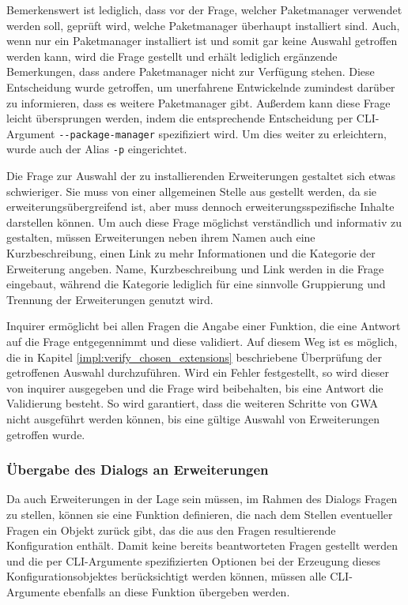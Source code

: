 Bemerkenswert ist lediglich, dass vor der Frage, welcher Paketmanager verwendet werden soll, geprüft wird, welche Paketmanager überhaupt installiert sind. Auch, wenn nur ein Paketmanager installiert ist und somit gar keine Auswahl getroffen werden kann, wird die Frage gestellt und erhält lediglich ergänzende Bemerkungen, dass andere Paketmanager nicht zur Verfügung stehen. Diese Entscheidung wurde getroffen, um unerfahrene Entwickelnde zumindest darüber zu informieren, dass es weitere Paketmanager gibt. Außerdem kann diese Frage leicht übersprungen werden, indem die entsprechende Entscheidung per \gls{CLI}-Argument \verb|--package-manager| spezifiziert wird. Um dies weiter zu erleichtern, wurde auch der Alias \verb|-p| eingerichtet.

Die Frage zur Auswahl der zu installierenden Erweiterungen gestaltet sich etwas schwieriger. Sie muss von einer allgemeinen Stelle aus gestellt werden, da sie erweiterungsübergreifend ist, aber muss dennoch erweiterungsspezifische Inhalte darstellen können. Um auch diese Frage möglichst verständlich und informativ zu gestalten, müssen Erweiterungen neben ihrem Namen auch eine Kurzbeschreibung, einen Link zu mehr Informationen und die Kategorie der Erweiterung angeben. Name, Kurzbeschreibung und Link werden in die Frage eingebaut, während die Kategorie lediglich für eine sinnvolle Gruppierung und Trennung der Erweiterungen genutzt wird.

Inquirer ermöglicht bei allen Fragen die Angabe einer Funktion, die eine Antwort auf die Frage entgegennimmt und diese validiert. Auf diesem Weg ist es möglich, die in Kapitel \ref{impl:verify_chosen_extensions} beschriebene Überprüfung der getroffenen Auswahl durchzuführen. Wird ein Fehler festgestellt, so wird dieser von inquirer ausgegeben und die Frage wird beibehalten, bis eine Antwort die Validierung besteht. So wird garantiert, dass die weiteren Schritte von \gls{GWA} nicht ausgeführt werden können, bis eine gültige Auswahl von Erweiterungen getroffen wurde.

\subsubsection{Übergabe des Dialogs an Erweiterungen}
\label{impl:extension_questions}

Da auch Erweiterungen in der Lage sein müssen, im Rahmen des Dialogs Fragen zu stellen, können sie eine Funktion definieren, die nach dem Stellen eventueller Fragen ein Objekt zurück gibt, das die aus den Fragen resultierende Konfiguration enthält. Damit keine bereits beantworteten Fragen gestellt werden und die per \gls{CLI}-Argumente spezifizierten Optionen bei der Erzeugung dieses Konfigurationsobjektes berücksichtigt werden können, müssen alle \gls{CLI}-Argumente ebenfalls an diese Funktion übergeben werden.

